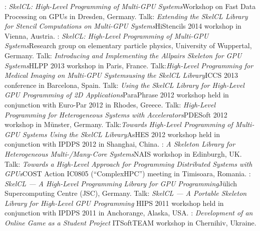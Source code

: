          {: \emph{SkelCL\@: High-Level Programming of Multi-GPU
          Systems}\newline \small Workshop on Fast Data Processing on GPUs in
          Dresden, Germany.}
         {Talk: \emph{Extending the SkelCL Library for Stencil
          Computations on Multi-GPU Systems}\newline \small HiStencils 2014
          workshop in Vienna, Austria.}
         {: \emph{SkelCL\@: High-Level Programming of Multi-GPU
          Systems}\newline \small Research group on elementary particle physics,
          University of Wuppertal, Germany.}
         {Talk: \emph{Introducing and Implementing the Allpairs Skeleton for GPU
          Systems}\newline \small HLPP 2013 workshop in Paris, France.}
         {Talk:\emph{High-Level Programming for Medical Imaging on Multi-GPU
          Systems\newline using the SkelCL Library}\newline \small ICCS 2013 conference in
          Barcelona, Spain.}
       {Talk: \emph{Using the SkelCL Library for High-Level GPU Programming of
        2D Applications}\newline \small ParaPhrase 2012 workshop held in
        conjunction with Euro-Par 2012 in Rhodes, Greece.}
       {Talk: \emph{High-Level Programming for Heterogeneous Systems with
        Accelerators}\newline \small PDESoft 2012 workshop in Münster, Germany.}
       {Talk:\emph{Towards High-Level Programming of Multi-GPU Systems Using
        the SkelCL Library}\newline \small AsHES 2012 workshop held in
        conjunction with IPDPS 2012 in Shanghai, China.}
       {: \emph{A Skeleton Library for Heterogeneous
        Multi-/Many-Core Systems}\newline \small NAIS workshop in Edinburgh, UK.}
       {Talk: \emph{Towards a High-Level Approach for Programming Distributed
        Systems with GPUs}\newline \small COST Action IC0805 (``ComplexHPC'')
        meeting in Timisoara, Romania.}
       {: \emph{SkelCL --- A High-Level Programming Library for GPU
        Programming}\newline \small Jülich Supercomputing Centre (JSC), Germany.}
       {Talk: \emph{SkelCL --- A Portable Skeleton Library for High-Level
        GPU Programming}\newline
        \small HIPS 2011 workshop held in conjunction with IPDPS 2011 in
        Anchorange, Alaska, USA.}
       {: \emph{Development of an Online Game as a Student Project}\newline
        \small ITSoftTEAM workshop in Chernihiv, Ukraine.}
